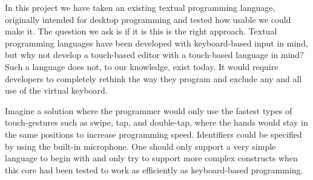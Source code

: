 In this project we have taken an existing textual programming language, originally intended for desktop programming and tested how usable we could make it. The question we ask is if it is this is the right approach. Textual programming languages have been developed with keyboard-based input in mind, but why not develop a touch-based editor with a touch-based language in mind? Such a language does not, to our knowledge, exist today. It would require developers to completely rethink the way they program and exclude any and all use of the virtual keyboard.

Imagine a solution where the programmer would only use the fastest types of touch-gestures such as swipe, tap, and double-tap, where the hands would stay in the same positions to increase programming speed. Identifiers could be specified by using the built-in microphone. One should only support a very simple language to begin with and only try to support more complex constructs when this core had been tested to work as efficiently as keyboard-based programming.

